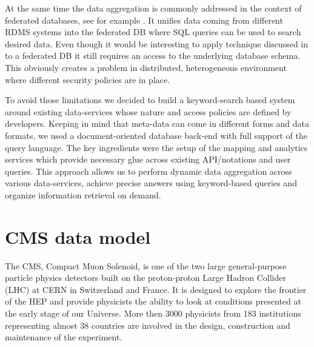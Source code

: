 \documentclass[1p,times]{elsarticle}
\begin{document}
At the same time the data aggregation is commonly addressed in the context of
federated databases, see for example \cite{FedDB}. It unifies data coming 
from different RDMS systems into the federated DB where SQL queries can be used to 
search desired data. Even though it would be interesting to apply technique 
discussed in \cite{DBS-QL} to a federated DB it still requires 
an access to the underlying database schema. This obviously creates a problem
in distributed, heterogeneous environment where different security policies
are in place.

To avoid those limitations we decided to build a keyword-search based system around
existing data-services whose nature and access policies are defined by developers.
Keeping in mind that meta-data can come in different forms and data formats,
we used a document-oriented database back-end with full support of the query language.
The key ingredients were the setup of the mapping and analytics services which provide
necessary glue across existing API/notations and user queries. This approach 
allows us to perform dynamic data aggregation across various data-services, achieve
precise answers using keyword-based queries
and organize information retrieval on demand.

\section{CMS data model\label{DataModel}}
The CMS, Compact Muon Solenoid, \cite{CMS} 
is one of the two large general-purpose particle physics detectors built on 
the proton-proton Large Hadron Collider (LHC) at CERN in Switzerland and France. 
It is designed to explore the frontier of the HEP and provide physicists
the ability to look at conditions presented at the early stage of our Universe.
More then 3000 physicists from 183 institutions representing almost 
38 countries are involved in the design, construction and maintenance of the experiment.
\end{document}
